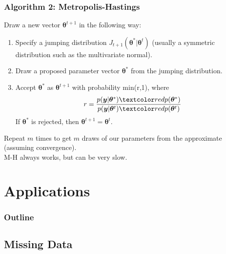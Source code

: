 \documentclass[handout]{beamer}
\begin{document}
\begin{frame}
\frametitle{Algorithm 2: Metropolis-Hastings}
\pause 
Draw a new vector $\bm{\theta}^{t+1}$ in the following way:
\pause
\begin{enumerate}
\item Specify a jumping distribution $J_{t+1}(\bm{\theta}^* |
\bm{\theta}^{t})$ \pause (usually a symmetric distribution such as the multivariate normal).
\pause
\item Draw a proposed parameter vector $\bm{\theta}^*$ from the jumping
distribution. 
\pause
\item Accept $\bm{\theta}^*$ as $\bm{\theta}^{t+1}$ with probability
min(r,1), where 
\pause
\begin{eqnarray*}
r = \frac{p(\bm{y}|\bm{\theta}^*) \red{p(\bm{\theta}^*)}}{p(\bm{y}|\bm{\theta}^{t}) \red{p(\bm{\theta}^{t})}}
\end{eqnarray*}
\pause
If $\bm{\theta}^*$ is rejected, then $\bm{\theta}^{t+1} = \bm{\theta}^t$.
\end{enumerate}
\pause
\bigskip
Repeat $m$ times to get $m$ draws of our parameters from the
approximate  (assuming convergence). \\
\pause
\bigskip
M-H always works, but can be very slow.\\
\end{frame}

\section{Applications}

\begin{frame}
\frametitle{Outline}
\tableofcontents[currentsection]
\end{frame}

\subsection{Missing Data}
\end{document}
